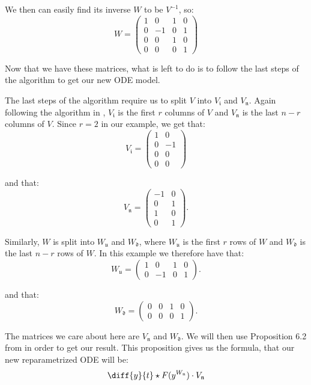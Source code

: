 \documentclass[oneside, a4paper, onecolumn, 11pt]{article}
\begin{document}
We then can easily find its inverse \(W\) to be \(V^{-1}\), so:
\[
    W = \begin{pmatrix}
        1 & 0  & 1 & 0 \\
        0 & -1 & 0 & 1 \\
        0 & 0  & 1 & 0 \\
        0 & 0  & 0 & 1
    \end{pmatrix}
\]

Now that we have these matrices, what is left to do is to follow the last steps of the algorithm to get our new ODE model.

The last steps of the algorithm require us to split \(V\) into \(V_{\mathfrak{i}}\) and \(V_{\mathfrak{n}}\). Again following the algorithm in \cite{Hubert2013}, \(V_{\mathfrak{i}}\) is the first \(r\) columns of \(V\) and \(V_{\mathfrak{n}}\) is the last \(n - r\) columns of \(V\). Since \(r = 2\) in our example, we get that:
\[
    V_{\mathfrak{i}} = \begin{pmatrix}
        1 & 0  \\
        0 & -1 \\
        0 & 0  \\
        0 & 0
    \end{pmatrix}
\]

and that:
\[
    V_{\mathfrak{n}} = \begin{pmatrix}
        -1 & 0 \\
        0  & 1 \\
        1  & 0 \\
        0  & 1
    \end{pmatrix}.
\]

Similarly, \(W\) is split into \(W_{\mathfrak{u}}\) and \(W_{\mathfrak{d}}\), where \(W_{\mathfrak{u}}\) is the first \(r\) rows of \(W\) and \(W_{\mathfrak{d}}\) is the last \(n - r\) rows of \(W\). In this example we therefore have that:
\[
    W_{\mathfrak{u}} = \begin{pmatrix}
        1 & 0  & 1 & 0 \\
        0 & -1 & 0 & 1
    \end{pmatrix}.
\]

and that:
\[
    W_{\mathfrak{d}} = \begin{pmatrix}
        0 & 0 & 1 & 0 \\
        0 & 0 & 0 & 1
    \end{pmatrix}.
\]

The matrices we care about here are \(V_{\mathfrak{n}}\) and \(W_{\mathfrak{d}}\). We will then use Proposition 6.2 from \cite{Hubert2013} in order to get our result. This proposition gives us the formula, that our new reparametrized ODE will be:
\[
    \diff{y}{t} \star F(y^{W_{\mathfrak{n}}}) \cdot V_{\mathfrak{n}}
\]
\end{document}
